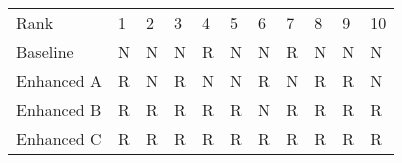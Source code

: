 \begin{tabular}{lllllllllll}
Rank & 1 & 2 & 3 & 4 & 5 & 6 & 7 & 8 & 9 & 10 \\
Baseline & N & N & N & R & N & N & R & N & N & N \\
Enhanced A & R & N & R & N & N & R & N & R & R & N \\
Enhanced B & R & R & R & R & R & N & R & R & R & R \\
Enhanced C & R & R & R & R & R & R & R & R & R & R \\
\end{tabular}
